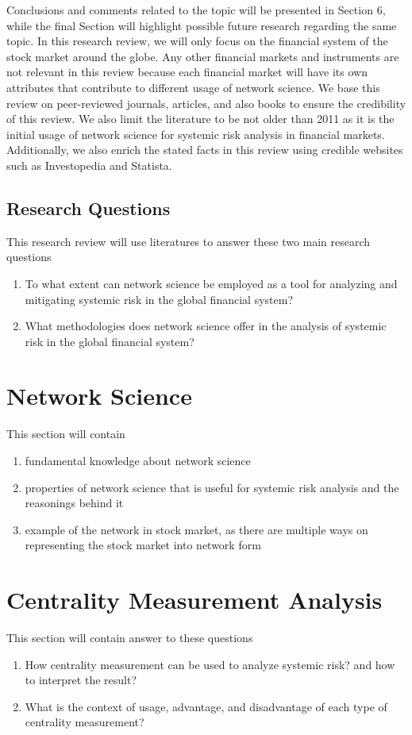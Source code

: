 \documentclass[a4paper,11pt]{article}
\begin{document}
Conclusions and comments related to the topic will be presented in Section 6, while the final Section will highlight possible future research regarding the same topic.
In this research review, we will only focus on the financial system of the stock market around the globe. Any other financial markets and instruments are not relevant in this review because each financial market will have its own attributes that contribute to different usage of network science.
We base this review on peer-reviewed journals, articles, and also books to ensure the credibility of this review. We also limit the literature to be not older than 2011 as it is the initial usage of network science for systemic risk analysis in financial markets. Additionally, we also enrich the stated facts in this review using credible websites such as Investopedia and Statista.

\subsection{Research Questions}
This research review will use literatures to answer these two main research questions
\begin{enumerate}
\item To what extent can network science be employed as a tool for analyzing and mitigating systemic risk in the global financial system?
\item What methodologies does network science offer in the analysis of systemic risk in the global financial system?
\end{enumerate}

\section{Network Science}
This section will contain
\begin{enumerate}
    \item fundamental knowledge about network science
    \item properties of network science that is useful for systemic risk analysis and the reasonings behind it
    \item example of the network in stock market, as there are multiple ways on representing the stock market into network form
\end{enumerate}

\section{Centrality Measurement Analysis}
This section will contain answer to these questions
\begin{enumerate}
    \item How centrality measurement can be used to analyze systemic risk? and how to interpret the result?
    \item What is the context of usage, advantage, and disadvantage of each type of centrality measurement?
\end{enumerate}
\end{document}
